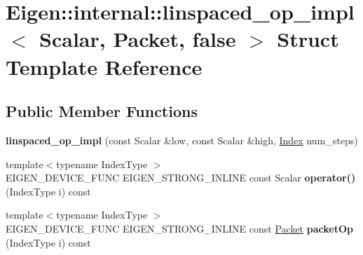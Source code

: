 \hypertarget{struct_eigen_1_1internal_1_1linspaced__op__impl_3_01_scalar_00_01_packet_00_01false_01_4}{}\section{Eigen\+:\+:internal\+:\+:linspaced\+\_\+op\+\_\+impl$<$ Scalar, Packet, false $>$ Struct Template Reference}
\label{struct_eigen_1_1internal_1_1linspaced__op__impl_3_01_scalar_00_01_packet_00_01false_01_4}
\subsection*{Public Member Functions}
\begin{DoxyCompactItemize}
\item 
\mbox{\label{struct_eigen_1_1internal_1_1linspaced__op__impl_3_01_scalar_00_01_packet_00_01false_01_4_a0ef567342fc3d2ffc7667de9fbb147ef}} 
{\bfseries linspaced\+\_\+op\+\_\+impl} (const Scalar \&low, const Scalar \&high, \hyperlink{namespace_eigen_a62e77e0933482dafde8fe197d9a2cfde}{Index} num\+\_\+steps)
\item 
\mbox{\label{struct_eigen_1_1internal_1_1linspaced__op__impl_3_01_scalar_00_01_packet_00_01false_01_4_afea6cee796a7dfb63c34d888457ac12b}} 
{\footnotesize template$<$typename Index\+Type $>$ }\\E\+I\+G\+E\+N\+\_\+\+D\+E\+V\+I\+C\+E\+\_\+\+F\+U\+NC E\+I\+G\+E\+N\+\_\+\+S\+T\+R\+O\+N\+G\+\_\+\+I\+N\+L\+I\+NE const Scalar {\bfseries operator()} (Index\+Type i) const
\item 
\mbox{\label{struct_eigen_1_1internal_1_1linspaced__op__impl_3_01_scalar_00_01_packet_00_01false_01_4_abfaac1602220b86936bf2a11fc7c3767}} 
{\footnotesize template$<$typename Index\+Type $>$ }\\E\+I\+G\+E\+N\+\_\+\+D\+E\+V\+I\+C\+E\+\_\+\+F\+U\+NC E\+I\+G\+E\+N\+\_\+\+S\+T\+R\+O\+N\+G\+\_\+\+I\+N\+L\+I\+NE const \hyperlink{union_eigen_1_1internal_1_1_packet}{Packet} {\bfseries packet\+Op} (Index\+Type i) const

\end{DoxyCompactItemize}
